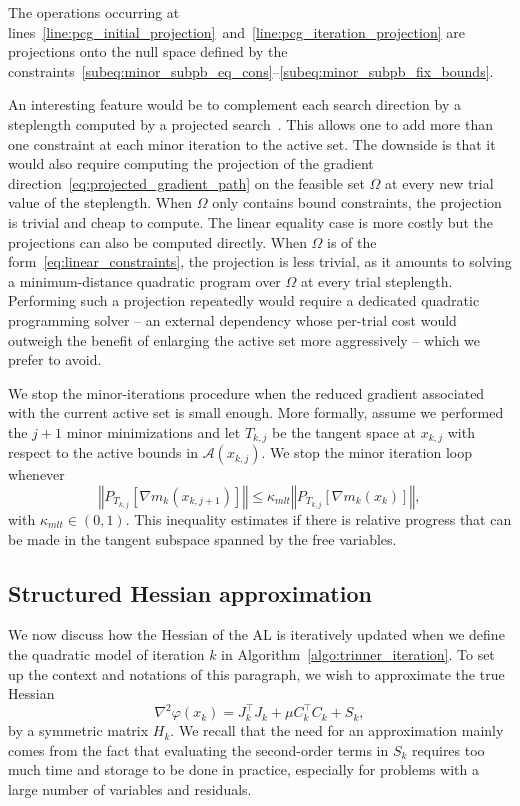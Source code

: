 \documentclass{article}
\numberwithin{equation}{section}
\newcommand{\calA}{{\mathcal{A}}}
\newcommand{\proj}[2]{P_{#1} \left[ {#2} \right]} %
\theoremstyle{plain}
\begin{document}
	The operations occurring at lines~\ref{line:pcg_initial_projection}~and~\ref{line:pcg_iteration_projection} are projections onto the null space defined by the constraints~\eqref{subeq:minor_subpb_eq_cons}--\eqref{subeq:minor_subpb_fix_bounds}.
	
	An interesting feature would be to complement each search direction by a steplength computed by a projected search~\cite{moretoraldo:1991,linmore:1999a}. This allows one to add more than one constraint at each minor iteration to the active set. The downside is that it would also require computing the projection of the gradient direction~\eqref{eq:projected_gradient_path} on the feasible set $\Omega$ at every new trial value of the steplength. When $\Omega$ only contains bound constraints, the projection is trivial and cheap to compute. The linear equality case is more costly but the projections can also be computed directly. When $\Omega$ is of the form~\eqref{eq:linear_constraints}, the projection is less trivial, as it amounts to solving a minimum-distance quadratic program over $\Omega$ at every trial steplength. Performing such a projection repeatedly would require a dedicated quadratic programming solver -- an external dependency whose per-trial cost would outweigh the benefit of enlarging the active set more aggressively -- which we prefer to avoid.
	
	We stop the minor-iterations procedure when the reduced gradient associated with the current active set is small enough. More formally, assume we performed the $j+1$ minor minimizations and let $T_{k,j}$ be the tangent space at $x_{k,j}$ with respect to the active bounds in $\calA(x_{k,j})$. We stop the minor iteration loop whenever
	\begin{equation*}
		\left\Vert \proj{T_{k,j}}{\nabla m_k(x_{k,j+1})} \right\Vert \le \kappa_{mlt} \left\Vert \proj{T_{k,j}}{\nabla m_k(x_k)}\right\Vert,
	\end{equation*}
	with $\kappa_{mlt} \in (0,1)$. This inequality estimates if there is relative progress that can be made in the tangent subspace spanned by the free variables. 
	
	\subsection{Structured Hessian approximation}\label{subsec:hessian_approx}
	
	We now discuss how the Hessian of the AL is iteratively updated when we define the quadratic model of iteration $k$ in Algorithm~\ref{algo:trinner_iteration}. To set up the context and notations of this paragraph, we wish to approximate the true Hessian
	\[\nabla^2 \varphi(x_k) = J_k^\top J_k + \mu C_k^\top C_k + S_k,\]  
	by a symmetric matrix $H_k$.
	We recall that the need for an approximation mainly comes from the fact that evaluating the second-order terms in $S_k$ requires too much time and storage to be done in practice, especially for problems with a large number of variables and residuals.
	
\end{document}
